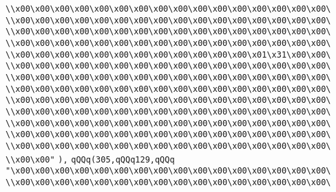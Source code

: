 \verb|\\x00\x00\x00\x00\x00\x00\x00\x00\x00\x00\x00\x00\x00\x00\x00\x00\|\newline
\verb|\\x00\x00\x00\x00\x00\x00\x00\x00\x00\x00\x00\x00\x00\x00\x00\x00\|\newline
\verb|\\x00\x00\x00\x00\x00\x00\x00\x00\x00\x00\x00\x00\x00\x00\x00\x00\|\newline
\verb|\\x00\x00\x00\x00\x00\x00\x00\x00\x00\x00\x00\x00\x00\x00\x00\x00\|\newline
\verb|\\x00\x00\x00\x00\x00\x00\x00\x00\x00\x00\x00\x00\x01\x31\x00\x00\|\newline
\verb|\\x00\x00\x00\x00\x00\x00\x00\x00\x00\x00\x00\x00\x00\x00\x00\x00\|\newline
\verb|\\x00\x00\x00\x00\x00\x00\x00\x00\x00\x00\x00\x00\x00\x00\x00\x00\|\newline
\verb|\\x00\x00\x00\x00\x00\x00\x00\x00\x00\x00\x00\x00\x00\x00\x00\x00\|\newline
\verb|\\x00\x00\x00\x00\x00\x00\x00\x00\x00\x00\x00\x00\x00\x00\x00\x00\|\newline
\verb|\\x00\x00\x00\x00\x00\x00\x00\x00\x00\x00\x00\x00\x00\x00\x00\x00\|\newline
\verb|\\x00\x00\x00\x00\x00\x00\x00\x00\x00\x00\x00\x00\x00\x00\x00\x00\|\newline
\verb|\\x00\x00\x00\x00\x00\x00\x00\x00\x00\x00\x00\x00\x00\x00\x00\x00\|\newline
\verb|\\x00\x00\x00\x00\x00\x00\x00\x00\x00\x00\x00\x00\x00\x00\x00\x00\|\newline
\verb|\\x00\x00"|\newline
\verb|),|\newline
\verb|qQQq(305,qQQq129,qQQq|\newline
\verb|"\x00\x00\x00\x00\x00\x00\x00\x00\x00\x00\x00\x00\x00\x00\x00\x00\|\newline
\verb|\\x00\x00\x00\x00\x00\x00\x00\x00\x00\x00\x00\x00\x00\x00\x00\x00\|\newline

